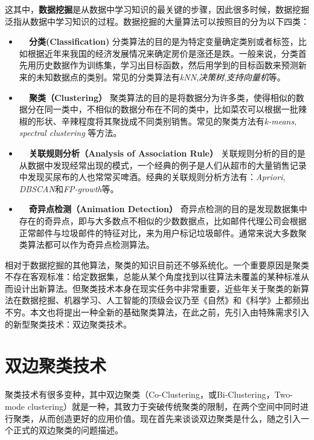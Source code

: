 \vspace{2mm}
这其中，\textbf{数据挖掘}是从数据中学习知识的最关键的步骤，因此很多时候，数据挖掘泛指从数据中学习知识的过程。数据挖掘的大量算法可以按照目的分为以下四类：

\begin{itemize}
    \item \textbf{~~分类(Classification)} 分类算法的目的是为特定变量确定类别或者标签，比如根据近年来我国的经济发展情况来确定房价是涨还是跌。一般来说，分类首先用历史数据作为训练集，学习出目标函数，然后用学到的目标函数来预测新来的未知数据点的类别。常见的分类算法有\emph{kNN}\cite{peterson2009k},\emph{决策树}\cite{quinlan1986induction},\emph{支持向量机}\cite{cortes1995support}等。
    \item \textbf{~~聚类（Clustering）} 聚类算法的目的是将数据分为许多类，使得相似的数据分在同一类中，不相似的数据分布在不同的类中，比如菜农可以根据一批辣椒的形状、辛辣程度将其聚拢成不同类别销售。常见的聚类方法有\emph{k-means}\cite{hartigan1979algorithm}, \emph{spectral clustering}\cite{ng2002spectral} 等方法。
    \item \textbf{~~关联规则分析（Analysis of Association Rule）} 关联规则分析的目的是从数据中发现经常出现的模式，一个经典的例子是人们从超市的大量销售记录中发现买尿布的人也常常买啤酒。经典的关联规则分析方法有：\emph{Apriori}\cite{agrawal1994fast}, \emph{DBSCAN}\cite{ester1996density}和\emph{FP-growth}\cite{han2000mining}等。
    \item \textbf{~~奇异点检测（Animation Detection）} 奇异点检测的目的是发现数据集中存在的奇异点，即与大多数点不相似的少数数据点，比如邮件代理公司会根据正常邮件与垃圾邮件的特征对比，来为用户标记垃圾邮件。通常来说大多数聚类算法都可以作为奇异点检测算法。
\end{itemize}

\vspace{2mm}
相对于数据挖掘的其他算法，聚类的知识目前还不够系统化。一个重要原因是聚类不存在客观标准：给定数据集，总能从某个角度找到以往算法未覆盖的某种标准从而设计出新算法\cite{estivill2002so}。但聚类技术本身在现实任务中非常重要，近些年关于聚类的新算法在数据挖掘、机器学习、人工智能的顶级会议乃至《自然》和《科学》上都频出不穷。本文也将提出一种全新的基础聚类算法，在此之前，先引入由特殊需求引入的新型聚类技术：双边聚类技术。



\section{双边聚类技术}
聚类技术有很多变种，其中双边聚类（Co-Clustering，或Bi-Clustering，Two-mode clustering）就是一种，其致力于突破传统聚类的限制，在两个空间中同时进行聚类，从而创造更好的应用价值。现在首先来谈谈双边聚类是什么，随之引入一个正式的双边聚类的问题描述。

